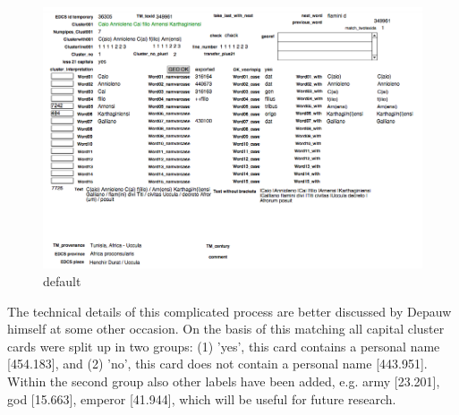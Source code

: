 \documentclass[amsthm,ebook]{saparticle}
\begin{document}
\begin{figure}[!bp]
\centering
 \includegraphics[width=\columnwidth]{EAGLE2016FullPaperVerreth-img001.png}
\caption{default}
\label{fig:1}
\end{figure}
 




The technical details of this complicated process are better discussed by Depauw himself at some other occasion. On the
basis of this matching all capital cluster cards were split up in two groups: (1) 'yes', this card contains a personal
name [454.183], and (2) 'no', this card does not contain a personal name [443.951]. Within the second group also other
labels have been added, e.g. army [23.201], god [15.663], emperor [41.944], which will be useful for future research.
\end{document}
